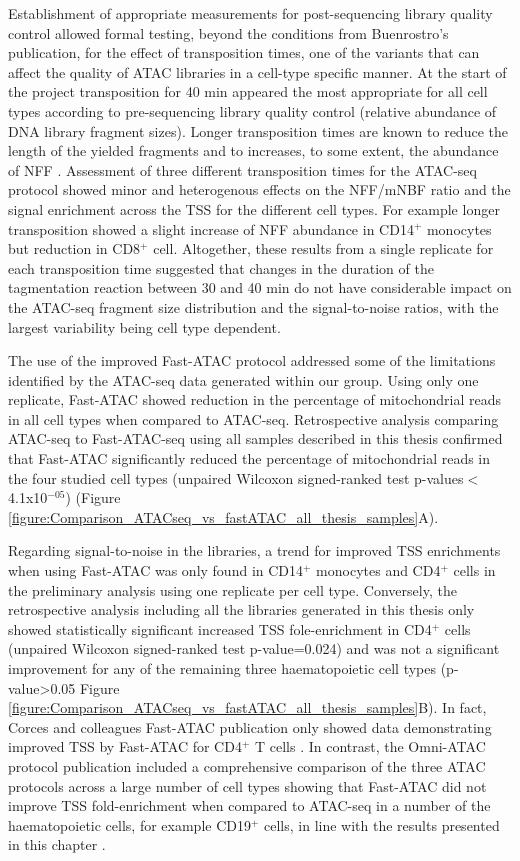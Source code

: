 Establishment of appropriate measurements for post-sequencing library quality control allowed formal testing, beyond the conditions from Buenrostro's publication, for the effect of transposition times, one of the variants that can affect the quality of ATAC libraries in a cell-type specific manner. At the start of the project transposition for 40 min appeared the most appropriate for all cell types according to pre-sequencing library quality control (relative abundance of DNA library fragment sizes). Longer transposition times are known to reduce the length of the yielded fragments and to increases, to some extent, the abundance of NFF \parencite{Raurell-Vila2018}. Assessment of three different transposition times for the ATAC-seq protocol showed minor and heterogenous effects on the NFF/mNBF ratio and the signal enrichment across the TSS for the different cell types. For example longer transposition showed a slight increase of NFF abundance in CD14$^+$ monocytes but reduction in CD8$^+$ cell. Altogether, these results from a single replicate for each transposition time suggested that changes in the duration of the tagmentation reaction between 30 and 40 min do not have considerable impact on the ATAC-seq fragment size distribution and the signal-to-noise ratios, with the largest variability being cell type dependent.

The use of the improved Fast-ATAC protocol addressed some of the limitations identified by the ATAC-seq data generated within our group. Using only one replicate, Fast-ATAC showed reduction in the percentage of mitochondrial reads in all cell types when compared to ATAC-seq. Retrospective analysis comparing ATAC-seq to Fast-ATAC-seq using all samples described in this thesis confirmed that Fast-ATAC significantly reduced the percentage of mitochondrial reads in the four studied cell types (unpaired Wilcoxon signed-ranked test p-values$<$4.1x10$^{-05}$) (Figure \ref{figure:Comparison_ATACseq_vs_fastATAC_all_thesis_samples}A). 

Regarding signal-to-noise in the libraries, a trend for improved TSS enrichments when using Fast-ATAC was only found in CD14$^+$ monocytes and CD4$^+$ cells in the preliminary analysis using one replicate per cell type. Conversely, the retrospective analysis including all the libraries generated in this thesis only showed statistically significant increased TSS fole-enrichment in CD4$^+$ cells (unpaired Wilcoxon signed-ranked test p-value=0.024) and was not a significant improvement for any of the remaining three haematopoietic cell types (p-value>0.05 Figure  \ref{figure:Comparison_ATACseq_vs_fastATAC_all_thesis_samples}B). In fact, Corces and colleagues Fast-ATAC publication only showed data demonstrating improved TSS by Fast-ATAC for CD4$^+$ T cells \parencite{Corces2016}. In contrast, the Omni-ATAC protocol publication included a comprehensive comparison of the three ATAC protocols across a large number of cell types showing that Fast-ATAC did not improve TSS fold-enrichment when compared to ATAC-seq in a number of the haematopoietic cells, for example CD19$^+$ cells, in line with the results presented in this chapter \parencite{Corces2017}.

